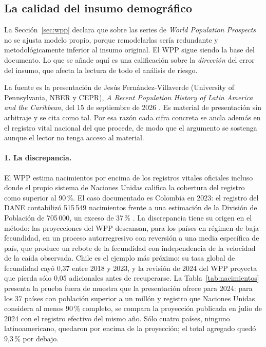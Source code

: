 \documentclass[12pt, letterpaper]{article}
\begin{document}
\subsection{La calidad del insumo demográfico}
\label{sec:insumo}

La Sección~\ref{sec:wpp} declara que sobre las series de \emph{World Population
Prospects} no se ajusta modelo propio, porque remodelarlas sería redundante y
metodológicamente inferior al insumo original. El WPP sigue siendo la base del
documento. Lo que se añade aquí es una calificación sobre la \emph{dirección} del
error del insumo, que afecta la lectura de todo el análisis de riesgo.

La fuente es la presentación de Jesús Fernández-Villaverde (University of
Pennsylvania, NBER y CEPR), \emph{A Recent Population History of Latin America and
the Caribbean}, del 15 de septiembre de 2026 \citep{fv2026}. Es material de
presentación sin arbitraje y se cita como tal. Por esa razón cada cifra concreta se
ancla además en el registro vital nacional del que procede, de modo que el
argumento se sostenga aunque el lector no tenga acceso al material.

\paragraph{1. La discrepancia.} El WPP estima nacimientos por encima de los
registros vitales oficiales incluso donde el propio sistema de Naciones Unidas
califica la cobertura del registro como superior al 90\,\%. El caso documentado es
Colombia en 2023: el registro del DANE contabilizó 515\,549 nacimientos frente a
una estimación de la División de Población de 705\,000, un exceso de 37\,\%
\citep{fv2026}. La discrepancia tiene su origen en el método: las proyecciones del WPP descansan, para los países en régimen de baja
fecundidad, en un proceso autorregresivo con reversión a una media específica de
país, que produce un rebote de la fecundidad con independencia de la velocidad de
la caída observada. Chile es el ejemplo más próximo: su tasa global de fecundidad
cayó 0,37 entre 2018 y 2023, y la revisión de 2024 del WPP proyecta que pierda sólo
0,05 adicionales antes de recuperarse. La Tabla~\ref{tab:nacimientos} presenta la
prueba fuera de muestra que la presentación ofrece para 2024: para los 37 países
con población superior a un millón y registro que Naciones Unidas considera al
menos 90\,\% completo, se compara la proyección publicada en julio de 2024 con el
registro efectivo del mismo año. Sólo cuatro países, ninguno latinoamericano,
quedaron por encima de la proyección; el total agregado quedó 9,3\,\% por debajo.
\end{document}
